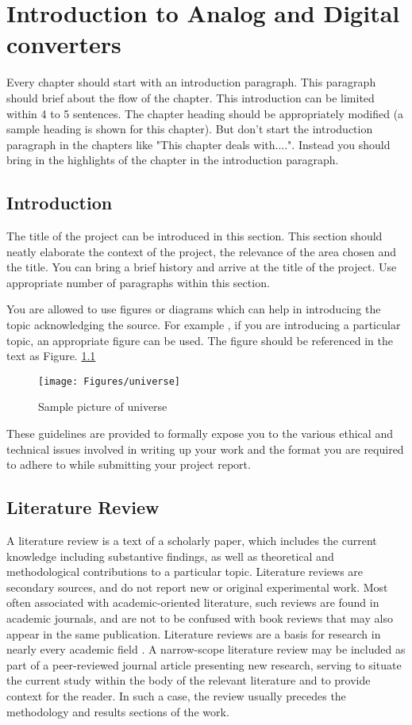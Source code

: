 \chapter{Introduction to Analog and Digital converters}
Every chapter should start with an introduction paragraph. This paragraph should brief about the flow of the chapter. This introduction can be limited within 4 to 5 sentences. The chapter heading should be appropriately modified (a sample heading is shown for this chapter). But don't start the introduction paragraph in the chapters like "This chapter deals with....". Instead you should bring in the highlights of the chapter in the introduction paragraph.

\section[Introduction]{\textbf{Introduction}}
The title of the project can be introduced in this section. This section should neatly elaborate the context of the project, the relevance of the area chosen and the title. You can bring a brief history and arrive at the title of the project. Use appropriate number of paragraphs within this section. 

You are allowed to use figures or diagrams which can help in introducing the topic acknowledging the source. For example , if you are introducing a particular topic, an appropriate figure can be used. The figure should be referenced in the text as Figure. \ref{fig:universe} 
\begin{figure}[htb]
\centering
	\texttt{[image: Figures/universe]}	
	\caption{Sample picture of universe }
	\label{fig:universe}
\end{figure}

These guidelines are provided to formally expose you to the various ethical and technical issues involved in writing up your work and the format you are required to adhere to while submitting your project report.

\section[Literature Review]{\textbf{Literature Review}}

A literature review is a text of a scholarly paper, which includes the current knowledge including substantive findings, as well as theoretical and methodological contributions to a particular topic. Literature reviews are secondary sources, and do not report new or original experimental work. Most often associated with academic-oriented literature, such reviews are found in academic journals, and are not to be confused with book reviews that may also appear in the same publication. Literature reviews are a basis for research in nearly every academic field . A narrow-scope literature review may be included as part of a peer-reviewed journal article presenting new research, serving to situate the current study within the body of the relevant literature and to provide context for the reader. In such a case, the review usually precedes the methodology and results sections of the work.

